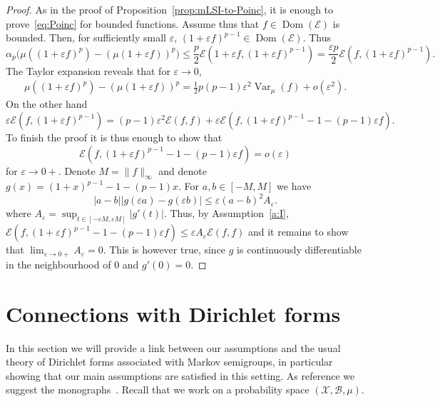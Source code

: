 \documentclass[a4paper]{amsart}
\theoremstyle{definition}
\theoremstyle{remark}
\numberwithin{equation}{section}
\newcommand{\calX}{\mathcal{X}}
\newcommand{\calB}{\mathcal{B}}
\DeclareMathOperator{\Dom}{Dom} %
\newcommand*{\calE}{\mathcal{E}}
\DeclareMathOperator{\Var}{Var}	%
\begin{document}
\begin{proof}
As in the proof of Proposition~\ref{prop:mLSI-to-Poinc}, it is enough to prove~\eqref{eq:Poinc} for bounded functions. Assume thus that $f \in \Dom(\calE)$ is bounded. 
Then, for sufficiently small $\varepsilon$, $(1+\varepsilon f)^{p-1} \in \Dom(\calE)$. Thus
\begin{displaymath}
  \alpha_p\Big(\mu((1+\varepsilon f)^p) - (\mu(1+\varepsilon f))^p\Big) \le \frac{p}{2}\calE(1+ \varepsilon f,(1+\varepsilon f)^{p-1}) = \frac{\varepsilon p}{2} \calE( f,(1+\varepsilon f)^{p-1}).
\end{displaymath}
The Taylor expansion reveals that for $\varepsilon \to 0$,
\begin{align*}
\mu((1+\varepsilon f)^p) - (\mu(1+\varepsilon f))^p = \frac{1}{2}p(p-1)\varepsilon^2 \Var_\mu(f)  + o(\varepsilon^2).
\end{align*}
On the other hand
\begin{displaymath}
  \varepsilon\calE(f,(1+\varepsilon f)^{p-1}) = (p-1)\varepsilon^2\calE(f,f) + \varepsilon \calE( f, (1+\varepsilon f)^{p-1} - 1 - (p-1)\varepsilon f).
\end{displaymath}
To finish the proof it is thus enough to show that
\begin{displaymath}
  \calE( f, (1+\varepsilon f)^{p-1} - 1 - (p-1)\varepsilon f) = o(\varepsilon)
\end{displaymath}
for $\varepsilon \to 0+$. Denote $M = \|f\|_\infty$ and denote $g(x) = (1+x)^{p-1} - 1 - (p-1)x$. For $a,b \in [-M,M]$ we have
\begin{displaymath}
  |a - b||g(\varepsilon a)  - g(\varepsilon b)| \le \varepsilon (a-b)^2 A_\varepsilon.
\end{displaymath}
where $A_\varepsilon = \sup_{t \in [-\varepsilon M,\varepsilon M]} |g'(t)|$. Thus, by Assumption~\ref{a:I},
$\calE( f, (1+\varepsilon f)^{p-1} - 1 - (p-1)\varepsilon f) \le \varepsilon A_\varepsilon \calE(f,f)$ and it remains to show that $\lim_{\varepsilon \to 0+} A_\varepsilon = 0$. This is however true, since $g$ is continuously differentiable in the neighbourhood of $0$ and $g'(0) = 0$.
\end{proof}


\section{Connections with Dirichlet forms}

In this section we will provide a link between our assumptions and the usual theory of Dirichlet forms associated with Markov semigroups, in particular showing that our main assumptions are satisfied in this setting.
As reference we suggest the monographs~\cite{MR1303354,MR3155209}.
Recall that we work on a probability space $(\calX,\calB,\mu)$.
\end{document}
